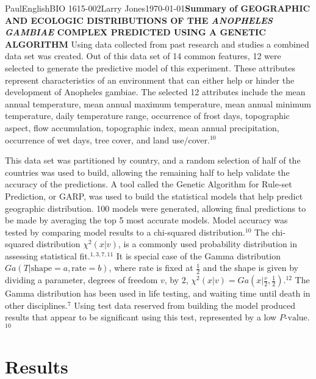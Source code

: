 \documentclass[10pt,twocolumn]{article}
\begin{document}
\begin{mla}{Paul}{English}{BIO 1615-002}{Larry Jones}{\today}{\textbf{Summary of GEOGRAPHIC AND ECOLOGIC DISTRIBUTIONS OF THE \textit{ANOPHELES GAMBIAE} COMPLEX PREDICTED USING A GENETIC ALGORITHM}}
Using data collected from past research and studies a combined data set was created. Out of this data set of 14 common features, 12 were selected to generate the predictive model of this experiment. These attributes represent characteristics of an environment that can either help or hinder the development of Anopheles gambiae. The selected 12 attributes include the mean annual temperature, mean annual maximum temperature, mean annual minimum temperature, daily temperature range, occurrence of frost days, topographic aspect, flow accumulation, topographic index, mean annual precipitation, occurrence of wet days, tree cover, and land use/cover.$^{10}$

This data set was partitioned by country, and a random selection of half of the countries was used to build, allowing the remaining half to help validate the accuracy of the predictions. A tool called the Genetic Algorithm for Rule-set Prediction, or GARP, was used to build the statistical models that help predict geographic distribution. 100 models were generated, allowing final predictions to be made by averaging the top 5 most accurate models. Model accuracy was tested by comparing model results to a chi-squared distribution.$^{10}$ The chi-squared distribution $\chi^2(x|v)$, is a commonly used probability distribution in assessing statistical fit.$^{1,3,7,11}$ It is special case of the Gamma distribution $Ga(T | \text{shape} = a, \text{rate} = b)$, where rate is fixed at $\frac{1}{2}$ and the shape is given by dividing a parameter, degrees of freedom $v$, by $2$, $\chi^2(x|v) = Ga(x | \frac{v}{2}, \frac{1}{2})$.$^{12}$ The Gamma distribution has been used in life testing, and waiting time until death in other disciplines.$^7$ Using test data reserved from building the model produced results that appear to be significant using this test, represented by a low $P\text{-value}$.$^{10}$

\section{Results}


\end{mla}
\end{document}
